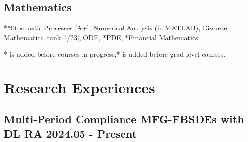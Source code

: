\documentclass[a4paper]{article}
\newcommand{\mygray}{\color{lg}}
\begin{document}
\subsection{Mathematics} 
**Stochastic Processes {\small[A+]}, Numerical Analysis {\small(in MATLAB)}, Discrete Mathematics {\small[rank 1/23]}, ODE, *PDE, *Financial Mathematics

{\parskip=2pt \mygray
* is added before courses in progress;\hfill ** is added before grad-level courses.}
\section{Research Experiences}  %

\hypertarget{FBSDEs}{
    \subsection{Multi-Period Compliance MFG-FBSDEs with DL \normalfont \hfill RA \hspace{40pt} 2024.05 - Present}}
    
\end{document}
